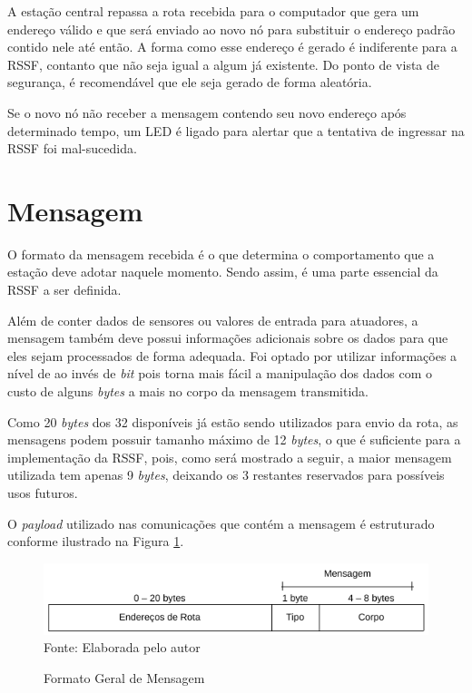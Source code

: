 {A estação central repassa a rota recebida para o computador que gera um endereço válido e que será enviado ao
novo nó para substituir o endereço padrão contido nele até então. A forma como esse endereço é gerado é
indiferente para a RSSF, contanto que não seja igual a algum já existente. Do ponto de vista de segurança, é
recomendável que ele seja gerado de forma aleatória.

Se o novo nó não receber a mensagem contendo seu novo endereço após determinado tempo, um LED é ligado para alertar
que a tentativa de ingressar na RSSF foi mal-sucedida.

\section{Mensagem}
O formato da mensagem recebida é o que determina o comportamento que a estação deve adotar naquele momento.
Sendo assim, é uma parte essencial da RSSF a ser definida.

Além de conter dados de sensores ou valores de entrada para atuadores, a mensagem também deve possui
informações adicionais sobre os dados para que eles sejam processados de forma adequada. Foi optado por
utilizar informações a nível de  ao invés de \textit{bit} pois torna mais fácil a manipulação dos
dados com o custo de alguns \textit{bytes} a mais no corpo da mensagem transmitida.

Como 20 \textit{bytes} dos 32 disponíveis já estão sendo utilizados para envio da rota, as mensagens podem
possuir tamanho máximo de 12 \textit{bytes}, o que é suficiente para a implementação da RSSF, pois, como será
mostrado a seguir, a maior mensagem utilizada tem apenas 9 \textit{bytes}, deixando os 3 restantes reservados
para possíveis usos futuros.

O \textit{payload} utilizado nas comunicações que contém a mensagem é estruturado conforme ilustrado na Figura \ref{figura:message_types}.
\begin{figure}[h!]
	\caption{Formato Geral de Mensagem}
	\centering
	\includegraphics[scale=0.5]{../images/mensagem_tipos.png}
	\hspace{\linewidth}
	Fonte: Elaborada pelo autor
	\label{figura:message_types}
\end{figure}

}
